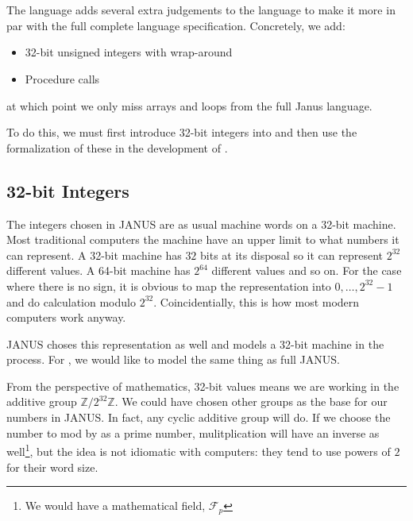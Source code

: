 \chapter{\januso{}}
\label{cha:januso}

The \januso{} language adds several extra judgements to the \janusz{}
language to make it more in par with the full complete language
specification. Concretely, we add:
\begin{itemize}
\item 32-bit unsigned integers with wrap-around
\item Procedure calls
\end{itemize}
at which point we only miss arrays and loops from the full Janus
language.

To do this, we must first introduce 32-bit integers into \coq{} and
then use the formalization of these in the development of \januso{}.

\section{32-bit Integers}
\label{sec:32-bit-integers}

The integers chosen in JANUS are as usual machine words on a 32-bit
machine. Most traditional computers the machine have an upper limit
to what numbers it can represent. A 32-bit machine has $32$ bits at
its disposal so it can represent $2^{32}$ different values. A 64-bit
machine has $2^{64}$ different values and so on. For the case where
there is no sign, it is obvious to map the representation into $0,
\dotsc, 2^{32}-1$ and do calculation modulo $2^{32}$. Coincidentially,
this is how most modern computers work anyway.

JANUS choses this representation as well and models a 32-bit machine
in the process. For \januso{}, we would like to model the same thing
as full JANUS.

From the perspective of mathematics, 32-bit values means we are
working in the additive group $\mathbb{Z}/2^{32}\mathbb{Z}$. We could
have chosen other groups as the base for our numbers in JANUS. In
fact, any cyclic additive group will do. If we choose the number to
mod by as a prime number, mulitplication will have an inverse as
well\footnote{We would have a mathematical field, $\mathcal{F}_p$},
but the idea is not idiomatic with computers: they tend to use powers
of $2$ for their word size.

